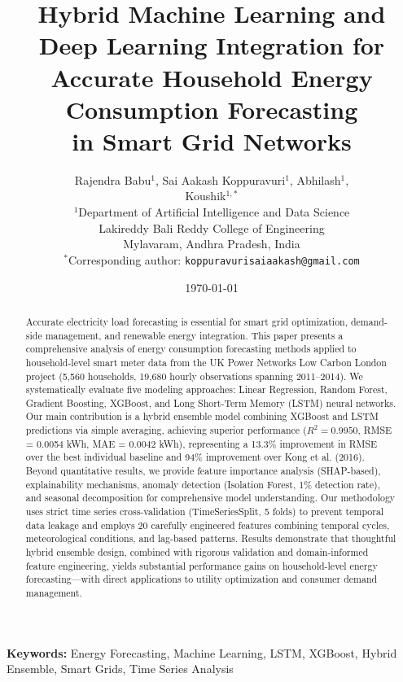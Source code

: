 \documentclass[11pt, a4paper, oneside]{article}
\title{\textbf{Hybrid Machine Learning and Deep Learning Integration for \\ 
Accurate Household Energy Consumption Forecasting \\ 
in Smart Grid Networks}}
\author{
    Rajendra Babu$^{1}$, Sai Aakash Koppuravuri$^{1}$, Abhilash$^{1}$, \\[0.3em]
    Koushik$^{1,*}$ \\[0.8em]
    $^{1}$Department of Artificial Intelligence and Data Science \\
    Lakireddy Bali Reddy College of Engineering \\
    Mylavaram, Andhra Pradesh, India \\[0.3em]
    $^{*}$Corresponding author: \texttt{koppuravurisaiaakash@gmail.com}
}
\date{\today}
\begin{document}
\maketitle


\begin{abstract}
Accurate electricity load forecasting is essential for smart grid optimization, demand-side management, and renewable energy integration. This paper presents a comprehensive analysis of energy consumption forecasting methods applied to household-level smart meter data from the UK Power Networks Low Carbon London project (5,560 households, 19,680 hourly observations spanning 2011--2014). We systematically evaluate five modeling approaches: Linear Regression, Random Forest, Gradient Boosting, XGBoost, and Long Short-Term Memory (LSTM) neural networks. Our main contribution is a hybrid ensemble model combining XGBoost and LSTM predictions via simple averaging, achieving superior performance ($R^2 = 0.9950$, RMSE = 0.0054 kWh, MAE = 0.0042 kWh), representing a 13.3\% improvement in RMSE over the best individual baseline and 94\% improvement over Kong et al. (2016). Beyond quantitative results, we provide feature importance analysis (SHAP-based), explainability mechanisms, anomaly detection (Isolation Forest, 1\% detection rate), and seasonal decomposition for comprehensive model understanding. Our methodology uses strict time series cross-validation (TimeSeriesSplit, 5 folds) to prevent temporal data leakage and employs 20 carefully engineered features combining temporal cycles, meteorological conditions, and lag-based patterns. Results demonstrate that thoughtful hybrid ensemble design, combined with rigorous validation and domain-informed feature engineering, yields substantial performance gains on household-level energy forecasting—with direct applications to utility optimization and consumer demand management.
\end{abstract}

\noindent
\textbf{Keywords:} Energy Forecasting, Machine Learning, LSTM, XGBoost, Hybrid Ensemble, Smart Grids, Time Series Analysis

\newpage

\end{document}
